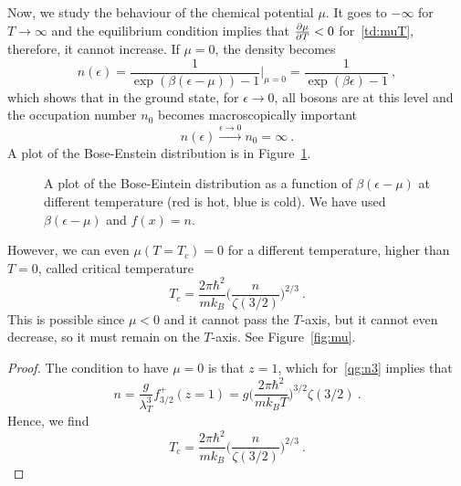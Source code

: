     Now, we study the behaviour of the chemical potential $\mu$. It goes to $-\infty$ for $T \rightarrow \infty$ and  the equilibrium condition implies that $\frac{\partial\mu}{\partial T} < 0$ for~\eqref{td:muT}, therefore, it cannot increase. If $\mu = 0$, the density becomes 
    \begin{equation*}
        n(\epsilon) = \frac{1}{\exp(\beta(\epsilon - \mu)) - 1} \Big \vert_{\mu = 0} = \frac{1}{\exp(\beta \epsilon) - 1} ~,
    \end{equation*}
    which shows that in the ground state, for $\epsilon \rightarrow 0$, all bosons are at this level and the occupation number $n_0$ becomes macroscopically important
    \begin{equation}\label{ninf}
        n(\epsilon) \xrightarrow{\epsilon \rightarrow 0} n_0 =\infty ~.
    \end{equation}
    A plot of the Bose-Enstein distribution is in Figure~\ref{fig:be}.
    \begin{figure}
        \centering
        \caption{A plot of the Bose-Eintein distribution as a function of $\beta (\epsilon - \mu)$ at different temperature (red is hot, blue is cold). We have used $\beta (\epsilon - \mu)$ and $f(x) = n$.}
        \label{fig:be}
    \end{figure}
    However, we can even $\mu(T=T_c) = 0$ for a different temperature, higher than $T=0$, called critical temperature 
    \begin{equation*}
        T_c = \frac{2 \pi \hbar^2}{m k_B} \Big ( \frac{n}{\zeta(3/2)} \Big)^{2/3} ~.
    \end{equation*}
    This is possible since $\mu < 0$ and it cannot pass the $T$-axis, but it cannot even decrease, so it must remain on the $T$-axis. See Figure~\eqref{fig:mu}. 
    \begin{proof}
        The condition to have $\mu = 0$ is that $z = 1$, which for~\eqref{qg:n3} implies that 
        \begin{equation*}
            n = \frac{g}{\lambda_T^3} f^+_{3/2} (z=1) = g \Big (\frac{2 \pi \hbar^2}{m k_B T} \Big)^{3/2} \zeta(3/2) ~.
        \end{equation*}
        Hence, we find
        \begin{equation*}
            T_c = \frac{2 \pi \hbar^2}{m k_B} \Big ( \frac{n}{\zeta(3/2)} \Big)^{2/3} ~.
        \end{equation*}
    \end{proof}

